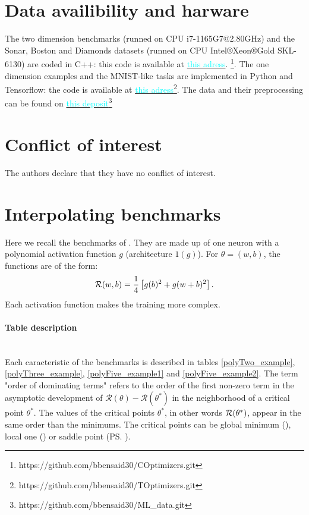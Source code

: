\section*{Data availibility and harware}
The two dimension benchmarks (runned on CPU i7-1165G7@2.80GHz) and the Sonar, Boston and Diamonds datasets (runned on CPU Intel®Xeon®Gold SKL-6130) are coded in C++: this code is available at \href{https://github.com/bbensaid30/COptimizers.git}{\textcolor{cyan}{this adress}}.	\footnote{https://github.com/bbensaid30/COptimizers.git}. The one dimension examples and the MNIST-like tasks are implemented in Python and Tensorflow: the code is available at \href {https://github.com/bbensaid30/TOptimizers.git}{\textcolor{cyan}{this adress}}\footnote{https://github.com/bbensaid30/TOptimizers.git}. The data and their preprocessing can be found on \href{https://github.com/bbensaid30/ML_data.git}{\textcolor{cyan}{this deposit}}\footnote{https://github.com/bbensaid30/ML\_data.git}

\section*{Conflict of interest}
The authors declare that they have no conflict of interest.

\newpage

\appendix

\section{Interpolating benchmarks}
\label{annexe_polys}

Here we recall the benchmarks of \cite{Bilel}. They are made up of one neuron with a polynomial activation function $g$ (architecture $1(g)$). For $\theta=(w,b)$, the functions are of the form:
\begin{equation*}
	\mathcal{R}(w,b)=\frac{1}{4}\left[g(b)^2+g(w+b)^2\right].
\end{equation*}
Each activation function makes the training more complex.

\paragraph{Table description}
~~\\
Each caracteristic of the benchmarks is described in tables \ref{polyTwo_example}, \ref{polyThree_example}, \ref{polyFive_example1} and \ref{polyFive_example2}. 
The term "order of dominating terms" refers to the order of the first non-zero term in the asymptotic development of $\mathcal{R}(\theta)-\mathcal{R}(\theta^*)$ in the neighborhood of a critical point $\theta^*$. 
The values of the critical points $\theta^*$, in other words $\mathcal{R}(\theta^*)$, appear in the same order than the minimums.
The critical points can be global minimum (\mg), local one (\ml) or saddle point (\ps).

